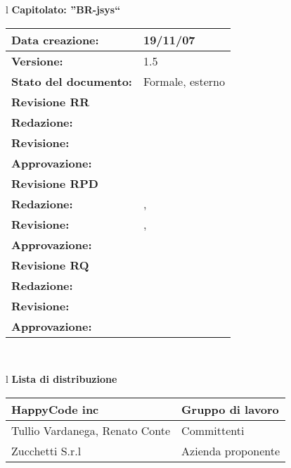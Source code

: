 

\newcommand{\lv}{ 1.5 } %
\newcommand{\dt}{ Piano Di Qualifica }%



\begin{center}
\thispagestyle{plain}
\begin{table}[htbp]
\large{
\begin{tabular}{l}
\Large{\textbf{\textsf{Capitolato: ''BR-jsys``}}} \\
\begin{tabular}{|p{6cm}|p{6cm}|} \hline
\textbf{Data creazione:} & 19/11/07 \\ \hline
\textbf{Versione:} & \lv \\ \hline
\textbf{Stato del documento:} & Formale, esterno \\ \hline
\textbf{Revisione RR} &    \\ \hline
\textbf{Redazione:} & \LA \\ \hline
\textbf{Revisione:} & \MT   \\ \hline
\textbf{Approvazione:}  & \ET \\ \hline
\textbf{Revisione RPD} &    \\ \hline
\textbf{Redazione:} & \ET , \AT \\ \hline
\textbf{Revisione:} & \MM , \MT \\ \hline
\textbf{Approvazione:}  & \MB \\ \hline
\textbf{Revisione RQ} &    \\ \hline
\textbf{Redazione:} & \\ \hline
\textbf{Revisione:} & \\ \hline
\textbf{Approvazione:}  & \\ \hline

\end{tabular} \\
\end{tabular}
}
\end{table}

\begin{table}[hbtp]
\large{
\begin{tabular}{l}
\Large{\textbf{\textsf{Lista di distribuzione}}} \\
\begin{tabular}{|p{6cm}|p{6cm}|} \hline
{HappyCode inc}& Gruppo di lavoro\\ \hline
{Tullio Vardanega, Renato Conte}& Committenti \\ \hline
{Zucchetti S.r.l}& Azienda proponente\\ \hline
\end{tabular} \\
\end{tabular}
}
\end{table}


\end{center}

